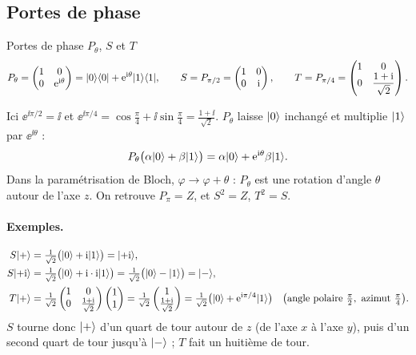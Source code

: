 \subsection{Portes de phase}\label{sec:phase}

\begin{definition}{Portes de phase $P_\theta$, $S$ et $T$}
\[
  P_\theta=\begin{pmatrix}1 & 0\\ 0 & \mathrm{e}^{\mathrm{i}\theta}\end{pmatrix}
  =|0\rangle\langle 0|+\mathrm{e}^{\mathrm{i}\theta}|1\rangle\langle 1|,
  \qquad
  S=P_{\pi/2}=\begin{pmatrix}1 & 0\\ 0 & \mathrm{i}\end{pmatrix},
  \qquad
  T=P_{\pi/4}=\begin{pmatrix}1 & 0\\ 0 & \dfrac{1+\mathrm{i}}{\sqrt2}\end{pmatrix}.
\]
\end{definition}

Ici $\ee^{\ii\pi/2}=\ii$ et $\ee^{\ii\pi/4}=\cos\frac\pi4+\ii\sin\frac\pi4=\frac{1+\ii}{\sqrt2}$.
$P_\theta$ laisse $|0\rangle$ inchangé et multiplie $|1\rangle$ par $\ee^{\ii\theta}$ :
\[
  P_\theta\big(\alpha|0\rangle+\beta|1\rangle\big)=\alpha|0\rangle+\mathrm{e}^{\mathrm{i}\theta}\beta|1\rangle.
\]
Dans la paramétrisation de Bloch, $\varphi\to\varphi+\theta$ : $P_\theta$ est une rotation
d'angle $\theta$ autour de l'axe $z$. On retrouve $P_\pi=Z$, et $S^2=Z$, $T^2=S$.

\paragraph{Exemples.}
\begin{align*}
  S|+\rangle&=\tfrac{1}{\sqrt2}\big(|0\rangle+\mathrm{i}|1\rangle\big)=|{+}\mathrm{i}\rangle,\\
  S|{+}\mathrm{i}\rangle&=\tfrac{1}{\sqrt2}\big(|0\rangle+\mathrm{i}\cdot\mathrm{i}|1\rangle\big)=\tfrac{1}{\sqrt2}\big(|0\rangle-|1\rangle\big)=|-\rangle,\\
  T|+\rangle&=\tfrac{1}{\sqrt2}\begin{pmatrix}1 & 0\\ 0 & \frac{1+\mathrm{i}}{\sqrt2}\end{pmatrix}\begin{pmatrix}1\\ 1\end{pmatrix}
    =\tfrac{1}{\sqrt2}\begin{pmatrix}1\\ \frac{1+\mathrm{i}}{\sqrt2}\end{pmatrix}
    =\tfrac{1}{\sqrt2}\big(|0\rangle+\mathrm{e}^{\mathrm{i}\pi/4}|1\rangle\big)\quad\big(\text{angle polaire }\tfrac\pi2,\ \text{azimut }\tfrac\pi4\big).
\end{align*}
$S$ tourne donc $|+\rangle$ d'un quart de tour autour de $z$ (de l'axe $x$ à l'axe $y$),
puis d'un second quart de tour jusqu'à $|-\rangle$ ; $T$ fait un huitième de tour.

